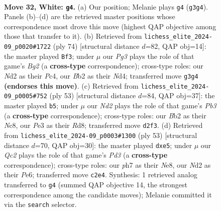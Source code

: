 \documentclass[11pt]{article}
\begin{document}
\clearpage

\begin{figure}[p]\centering
\begin{subfigure}{0.46\textwidth}\centering
\resizebox{\linewidth}{!}{%
\newchessgame
\chessboard[
  setfen={r3k2r/p3b1pp/8/nq1p4/p2P3P/4P1PK/1BQN4/2R5 w - - 6 32},
  showmover=false,
  pgfstyle=straightmove, color=movearrow, markmove={g3-g4}
]}
\caption{}
\end{subfigure}\hfill
\begin{subfigure}{0.46\textwidth}\centering
\resizebox{\linewidth}{!}{%
\newchessgame
\chessboard[
  setfen={1r6/1pp2rk1/6p1/p3q3/2PN1p1Q/PP5P/6BK/3R4 w - - 3 38},
  showmover=false,
  pgfstyle=straightmove, color=movearrow, markmove={g2-f3}
]}
\caption{}
\end{subfigure}
\\[4pt]
\begin{subfigure}{0.46\textwidth}\centering
\resizebox{\linewidth}{!}{%
\newchessgame
\chessboard[
  setfen={k1nr4/pb2q3/1p4pp/4P3/4P3/2Q3PB/P6P/2R3K1 b - - 6 27},
  showmover=false,
  pgfstyle=straightmove, color=movearrow, markmove={b6-b5}
]}
\caption{}
\end{subfigure}\hfill
\begin{subfigure}{0.46\textwidth}\centering
\resizebox{\linewidth}{!}{%
\newchessgame
\chessboard[
  setfen={2r1n3/6pk/3pp2p/2q1P3/5Q1P/3b1P2/PP4P1/3RK2R b - - 1 27},
  showmover=false,
  pgfstyle=straightmove, color=movearrow, markmove={d6-e5}
]}
\caption{}
\end{subfigure}
\caption{\textbf{Move 32, White: \texttt{g4}.} (a) Our position; Melanie plays \texttt{g4} (\texttt{g3g4}). Panels (b)--(d) are the retrieved master positions whose correspondence most drove this move (highest QAP objective among those that transfer to it). (b) Retrieved from \texttt{lichess\_elite\_2024-09\_p0020\#1722} (ply 74) [structural distance $d$=82, QAP obj=14]: the master played \texttt{Bf3}; under $\mu$ our \emph{Pg3} plays the role of that game's \emph{Bg2} (a \textbf{cross-type} correspondence); cross-type roles: our \emph{N}d2 as their \emph{P}c4, our \emph{B}b2 as their \emph{N}d4; transferred move \texttt{g3g4} \textbf{(endorses this move)}. (c) Retrieved from \texttt{lichess\_elite\_2024-09\_p0005\#752} (ply 53) [structural distance $d$=84, QAP obj=37]: the master played \texttt{b5}; under $\mu$ our \emph{Nd2} plays the role of that game's \emph{Pb3} (a \textbf{cross-type} correspondence); cross-type roles: our \emph{B}b2 as their \emph{N}c8, our \emph{P}e3 as their \emph{R}d8; transferred move \texttt{d2f3}. (d) Retrieved from \texttt{lichess\_elite\_2024-09\_p0003\#1300} (ply 53) [structural distance $d$=70, QAP obj=30]: the master played \texttt{dxe5}; under $\mu$ our \emph{Qc2} plays the role of that game's \emph{Pd3} (a \textbf{cross-type} correspondence); cross-type roles: our \emph{p}h7 as their \emph{N}e8, our \emph{N}d2 as their \emph{P}e6; transferred move \texttt{c2e4}. Synthesis: 1 retrieved analog transferred to \texttt{g4} (summed QAP objective 14, the strongest correspondence among the candidate moves); Melanie committed it via the \texttt{search} selector.}
\label{fig:thought-m62}
\end{figure}
\end{document}
